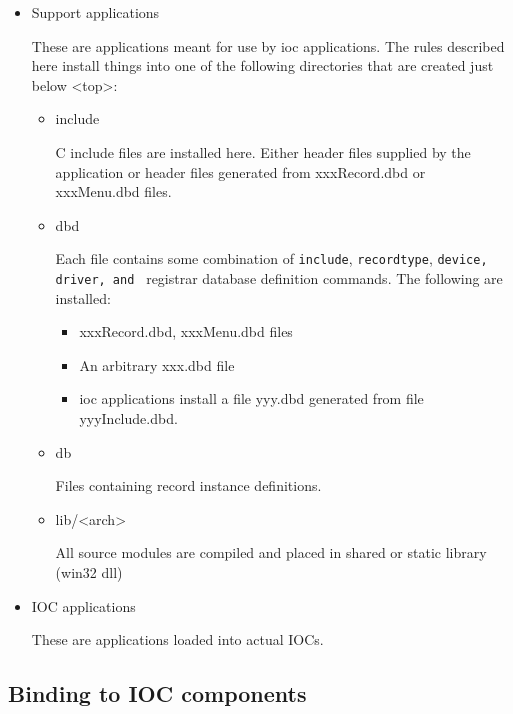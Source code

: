 \begin{itemize}

\item Support applications

These are applications meant for use by ioc applications. The rules described here install things into one of the 
following directories that are created just below \textless{}top\textgreater{}:

\begin{itemize}

\item include

C include files are installed here. Either header files supplied by the application or header files generated 
from xxxRecord.dbd or xxxMenu.dbd files.

\item dbd

Each file contains some combination of \verb|include|, \verb|recordtype|, \verb|device, driver, and |
registrar database definition commands. The following are installed:

\begin{itemize}

\item xxxRecord.dbd, xxxMenu.dbd files

\item An arbitrary xxx.dbd file

\item ioc applications install a file yyy.dbd generated from file yyyInclude.dbd.

\end{itemize}

\item db

Files containing record instance definitions. 

\item lib/\textless{}arch\textgreater{}

All source modules are compiled and placed in shared or static library (win32 dll)

\end{itemize}

\item IOC applications

These are applications loaded into actual IOCs.

\end{itemize}\subsection{Binding to IOC components}

